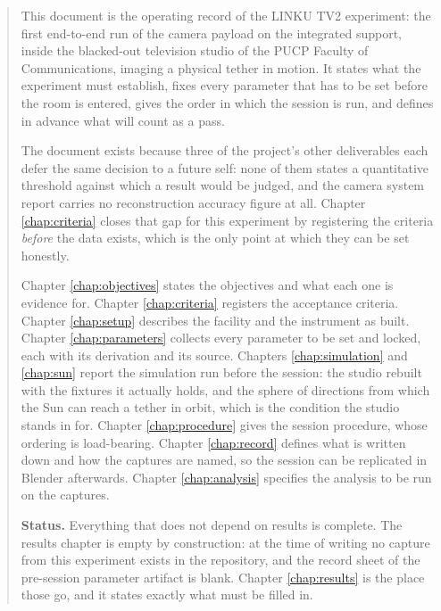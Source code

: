 \documentclass[a4paper, twoside]{report}
\begin{document}


\begin{abstract}
This document is the operating record of the LINKU TV2 experiment: the first
end-to-end run of the camera payload on the integrated support, inside the
blacked-out television studio of the PUCP Faculty of Communications, imaging a
physical tether in motion. It states what the experiment must establish, fixes
every parameter that has to be set before the room is entered, gives the order
in which the session is run, and defines in advance what will count as a pass.

The document exists because three of the project's other deliverables each
defer the same decision to a future self: none of them states a quantitative
threshold against which a result would be judged, and the camera system report
carries no reconstruction accuracy figure at all. Chapter \ref{chap:criteria}
closes that gap for this experiment by registering the criteria \emph{before}
the data exists, which is the only point at which they can be set honestly.

Chapter \ref{chap:objectives} states the objectives and what each one is
evidence for. Chapter \ref{chap:criteria} registers the acceptance criteria.
Chapter \ref{chap:setup} describes the facility and the instrument as built.
Chapter \ref{chap:parameters} collects every parameter to be set and locked,
each with its derivation and its source. Chapters \ref{chap:simulation} and
\ref{chap:sun} report the simulation run before the session: the studio
rebuilt with the fixtures it actually holds, and the sphere of directions
from which the Sun can reach a tether in orbit, which is the condition the
studio stands in for. Chapter \ref{chap:procedure} gives the
session procedure, whose ordering is load-bearing. Chapter \ref{chap:record}
defines what is written down and how the captures are named, so the session can
be replicated in Blender afterwards. Chapter \ref{chap:analysis} specifies the
analysis to be run on the captures.

\textbf{Status.} Everything that does not depend on results is complete. The
results chapter is empty by construction: at the time of writing no capture
from this experiment exists in the repository, and the record sheet of the
pre-session parameter artifact is blank. Chapter \ref{chap:results} is the
place those go, and it states exactly what must be filled in.
\end{abstract}

\tableofcontents
\listoffigures
\listoftables

















\end{document}

